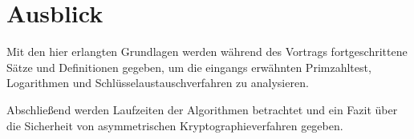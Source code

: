 \section*{Ausblick}\label{Kapitel Fazit}
	\wup Mit den hier erlangten Grundlagen werden während des Vortrags fortgeschrittene Sätze und Definitionen gegeben, um die eingangs erwähnten Primzahltest, Logarithmen und Schlüsselaustauschverfahren zu analysieren.

	\wup Abschließend werden Laufzeiten der Algorithmen betrachtet und ein Fazit über die Sicherheit von asymmetrischen Kryptographieverfahren gegeben.
